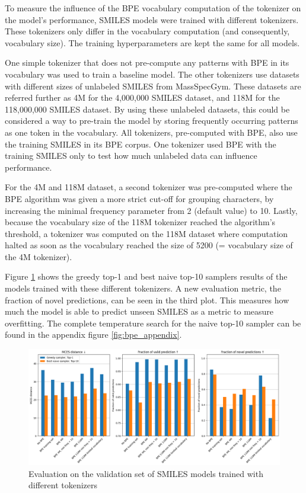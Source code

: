 To measure the influence of the \acf{BPE} vocabulary computation of the tokenizer on the model's performance, SMILES models were trained with different tokenizers.
These tokenizers only differ in the vocabulary computation (and consequently, vocabulary size).
The training hyperparameters are kept the same for all models.

One simple tokenizer that does not pre-compute any patterns with \ac{BPE} in its vocabulary was used to train a baseline model.
The other tokenizers use datasets with different sizes of unlabeled SMILES from MassSpecGym.
These datasets are referred further as 4M for the 4,000,000 SMILES dataset, and 118M for the 118,000,000 SMILES dataset.
By using these unlabeled datasets, this could be considered a way to pre-train the model by storing frequently occurring patterns as one token in the vocabulary. 
All tokenizers, pre-computed with \ac{BPE}, also use the training SMILES in its \ac{BPE} corpus.
One tokenizer used \ac{BPE} with the training SMILES only to test how much unlabeled data can influence performance.

For the 4M and 118M dataset, a second tokenizer was pre-computed where the \ac{BPE} algorithm was given a more strict cut-off for grouping characters, by increasing the minimal frequency parameter from 2 (default value) to 10.
Lastly, because the vocabulary size of the 118M tokenizer reached the algorithm's threshold, a tokenizer was computed on the 118M dataset where computation halted as soon as the vocabulary reached the size of 5200 (= vocabulary size of the 4M tokenizer). 

Figure \ref{fig:bpe} shows the greedy top-1 and best naive top-10 samplers results of the models trained with these different tokenizers.
A new evaluation metric, the fraction of novel predictions, can be seen in the third plot.
This measures how much the model is able to predict unseen SMILES as a metric to measure overfitting.
The complete temperature search for the naive top-10 sampler can be found in the appendix figure \ref{fig:bpe_appendix}.


\begin{figure}[h]
    \centering
    \includegraphics[width=1.0\textwidth]{figures/results/bpe.png}
    \caption{Evaluation on the validation set of SMILES models trained with different tokenizers}
    \label{fig:bpe}
\end{figure}

